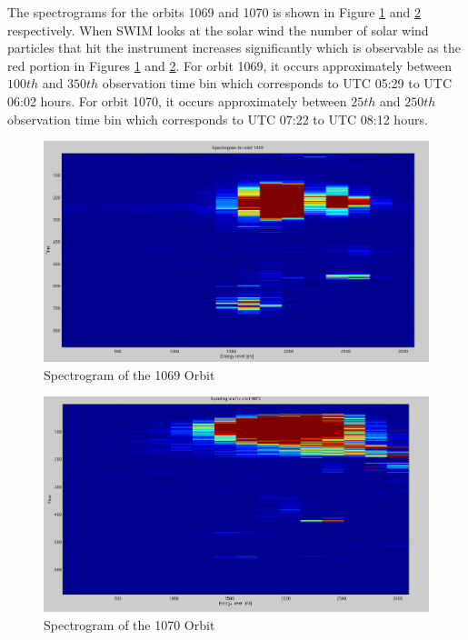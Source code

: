 \documentclass{article}
\begin{document}
The spectrograms for the orbits 1069 and 1070 is shown in Figure \ref{fig:spectrogram_1069} and \ref{fig:spectrogram_1070} respectively. When SWIM looks at the solar wind the number of solar wind particles that hit the instrument increases significantly which is observable as the red portion in Figures \ref{fig:spectrogram_1069} and \ref{fig:spectrogram_1070}. For orbit 1069, it occurs approximately between $100th$ and $350th$ observation time bin which corresponds to UTC 05:29 to UTC 06:02 hours. For orbit 1070, it occurs approximately between $25th$ and $250th$ observation time bin which corresponds to UTC 07:22 to UTC 08:12 hours.

\begin{figure}[h!]
\centering
\includegraphics[scale=0.35]{Figures/spectrogram_1069.png}
\caption{Spectrogram of the 1069 Orbit}
\label{fig:spectrogram_1069}
\end{figure}

\begin{figure}[h!]
\centering
\includegraphics[scale=0.35]{Figures/spectrogram_1070.png}
\caption{Spectrogram of the 1070 Orbit}
\label{fig:spectrogram_1070}
\end{figure}
\end{document}
